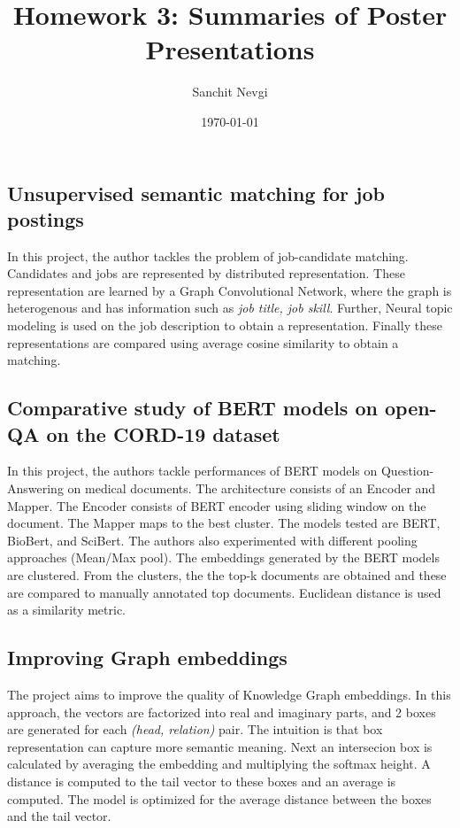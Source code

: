 \documentclass[11pt]{article}
\begin{document}
\title{\textbf{\LARGE{Homework 3: Summaries of Poster Presentations}}}

\date{\today}
\author{Sanchit Nevgi}
\maketitle

\subsection*{Unsupervised semantic matching for job postings}
In this project, the author tackles the problem of job-candidate matching. Candidates and jobs are represented by distributed representation. These representation are learned by a Graph Convolutional Network, where the graph is heterogenous and has information such as \textit{job title, job skill}. Further, Neural topic modeling is used on the job description to obtain a representation. Finally these representations are compared using average cosine similarity to obtain a matching.

\subsection*{Comparative study of BERT models on open-QA on the CORD-19 dataset}
In this project, the authors tackle performances of BERT models on Question-Answering on medical documents. The architecture consists of an Encoder and Mapper. The Encoder consists of BERT encoder using sliding window on the document. The Mapper maps to the best cluster. The models tested are BERT, BioBert, and SciBert. The authors also experimented with different pooling approaches (Mean/Max pool).
The embeddings generated by the BERT models are clustered. From the clusters, the the top-k documents are obtained and these are compared to manually annotated top documents. Euclidean distance is used as a similarity metric.

\subsection*{Improving Graph embeddings}
The project aims to improve the quality of Knowledge Graph embeddings.
In this approach, the vectors are factorized into real and imaginary parts, and 2 boxes are generated for each \textit{(head, relation)} pair. The intuition is that box representation can capture more semantic meaning. Next an intersecion box is calculated by averaging the embedding and multiplying the softmax height. A distance is computed to the tail vector to these boxes and an average is computed. The model is optimized for the average distance between the boxes and the tail vector.
\end{document}
